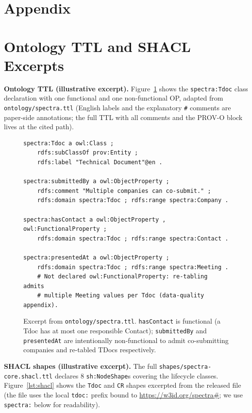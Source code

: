 \appendix
\section*{Appendix}

\section{Ontology TTL and SHACL Excerpts}\label{app:shacl}

\noindent\textbf{Ontology TTL (illustrative excerpt).} Figure~\ref{lst:ttl} shows the \texttt{spectra:Tdoc} class declaration with one functional and one non-functional OP, adapted from \texttt{ontology/spectra.ttl} (English labels and the explanatory \texttt{\#} comments are paper-side annotations; the full TTL with all comments and the PROV-O block lives at the cited path).

\begin{figure}[h]
\centering
\scriptsize
\begin{minipage}{0.95\textwidth}
\begin{verbatim}
spectra:Tdoc a owl:Class ;
    rdfs:subClassOf prov:Entity ;
    rdfs:label "Technical Document"@en .

spectra:submittedBy a owl:ObjectProperty ;
    rdfs:comment "Multiple companies can co-submit." ;
    rdfs:domain spectra:Tdoc ; rdfs:range spectra:Company .

spectra:hasContact a owl:ObjectProperty , owl:FunctionalProperty ;
    rdfs:domain spectra:Tdoc ; rdfs:range spectra:Contact .

spectra:presentedAt a owl:ObjectProperty ;
    rdfs:domain spectra:Tdoc ; rdfs:range spectra:Meeting .
    # Not declared owl:FunctionalProperty: re-tabling admits
    # multiple Meeting values per Tdoc (data-quality appendix).
\end{verbatim}
\end{minipage}
\caption{Excerpt from \texttt{ontology/spectra.ttl}. \texttt{hasContact} is functional (a Tdoc has at most one responsible Contact); \texttt{submittedBy} and \texttt{presentedAt} are intentionally non-functional to admit co-submitting companies and re-tabled TDocs respectively.}
\label{lst:ttl}
\end{figure}

\noindent\textbf{SHACL shapes (illustrative excerpt).} The full \texttt{shapes/\bk spectra-core.\bk shacl.\bk ttl} declares 8 \texttt{sh:NodeShape}s covering the lifecycle classes. Figure~\ref{lst:shacl} shows the \texttt{Tdoc} and \texttt{CR} shapes excerpted from the released file (the file uses the local \texttt{tdoc:} prefix bound to \url{https://w3id.org/spectra\#}; we use \texttt{spectra:} below for readability).

